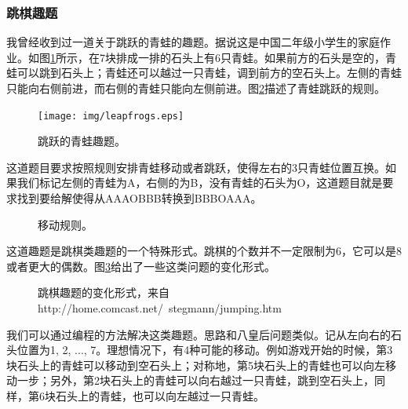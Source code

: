 \documentclass[UTF8]{article}
\begin{document}
\subsubsection{跳棋趣题}

我曾经收到过一道关于跳跃的青蛙的趣题。据说这是中国二年级小学生的家庭作业。如图\ref{fig:leapfrog}所示，在7块排成一排的石头上有6只青蛙。如果前方的石头是空的，青蛙可以跳到石头上；青蛙还可以越过一只青蛙，调到前方的空石头上。左侧的青蛙只能向右侧前进，而右侧的青蛙只能向左侧前进。图\ref{fig:pegrules}描述了青蛙跳跃的规则。

\begin{figure}[htbp]
 \centering
 \texttt{[image: img/leapfrogs.eps]}
 \caption{跳跃的青蛙趣题。}
 \label{fig:leapfrog}
\end{figure}

这道题目要求按照规则安排青蛙移动或者跳跃，使得左右的3只青蛙位置互换。如果我们标记左侧的青蛙为A，右侧的为B，没有青蛙的石头为O，这道题目就是要求找到要给解使得从AAAOBBB转换到BBBOAAA。

\begin{figure}[htbp]
 \centering
  \hspace{0.02\textwidth}
  \hspace{0.02\textwidth}
 \caption{移动规则。}
 \label{fig:pegrules}
\end{figure}

这道趣题是跳棋类趣题的一个特殊形式。跳棋的个数并不一定限制为6，它可以是8或者更大的偶数。图\ref{fig:pegpuzzles}给出了一些这类问题的变化形式。

\begin{figure}[htbp]
 \centering
  \hspace{0.02\textwidth}
  \hspace{0.02\textwidth}
 \caption{跳棋趣题的变化形式，来自http://home.comcast.net/~stegmann/jumping.htm}
 \label{fig:pegpuzzles}
\end{figure}

我们可以通过编程的方法解决这类趣题。思路和八皇后问题类似。记从左向右的石头位置为1, 2, ..., 7。理想情况下，有4种可能的移动。例如游戏开始的时候，第3块石头上的青蛙可以移动到空石头上；对称地，第5块石头上的青蛙也可以向左移动一步；另外，第2块石头上的青蛙可以向右越过一只青蛙，跳到空石头上，同样，第6块石头上的青蛙，也可以向左越过一只青蛙。
\end{document}
